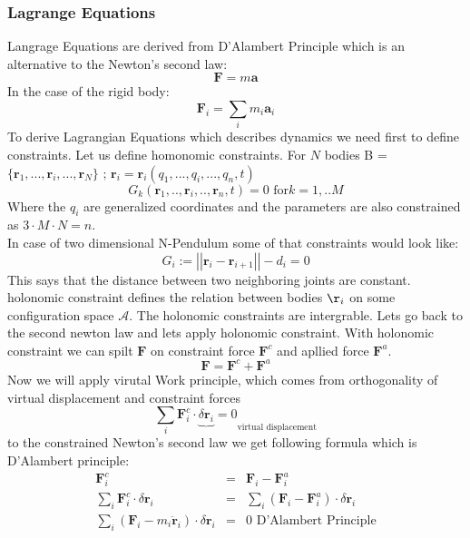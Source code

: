\subsubsection{Lagrange Equations}
Langrage Equations are derived from D’Alambert Principle\cite{dalambert} which is an alternative to the Newton's second law\cite{ClassPhy}:
\begin{equation}
	\mathbf{F} = m\mathbf{a}
\end{equation}   
In the case of the rigid body:
\begin{equation}
	\mathbf{F}_i = \sum_i{m_i \mathbf{a}_i}
\end{equation}
To derive Lagrangian Equations which describes dynamics we need first to define constraints. Let us define homonomic constraints.
For $N$ bodies B = $\{\mathbf{r}_1,...,\mathbf{r}_i,...,\mathbf{r}_N\}\text{ ; } \mathbf{r}_i=\mathbf{r}_i(q_1,...,q_i,...,q_n, t)$
\begin{equation}
	\boxed{G_k(\mathbf{r}_1,..,\mathbf{r}_i,..,\mathbf{r}_n,t)=0\text{ for}k=1,..M}
\end{equation}
Where the $q_i$ are generalized coordinates and the
parameters are also constrained as $3\cdot M\cdot N = n$.\\
In case of two dimensional N-Pendulum some of that constraints would look like:
\begin{equation}
	G_i := \left|\left|\mathbf{r}_i - \mathbf{r}_{i+1}\right|\right| - d_i = 0
\end{equation}
This says that the distance between two neighboring joints are constant.
holonomic constraint defines the relation between bodies $\r_i$ on some configuration space $\mathcal{A}$. The holonomic constraints are intergrable.
Lets go back to the second newton law and lets apply holonomic constraint. With holonomic constraint we can spilt $\mathbf{F}$ on constraint force $\mathbf{F}^c$ and apllied force $\mathbf{F}^a$.
\begin{equation}
	\mathbf{F} =\mathbf{F}^c + \mathbf{F}^a
\end{equation}
Now we will apply virutal Work principle, which comes from orthogonality of virtual displacement and constraint forces \cite{ortho}
\begin{equation}
	\boxed{\sum_i{\mathbf{F}_i^c \cdot \underbrace{\delta \mathbf{r}_i}=0}_\text{virtual displacement}}
\end{equation}
to the constrained Newton's second law we get following formula which is D'Alambert principle\cite{dalam}:
\begin{eqnarray}
	 \mathbf{F}^c_i &=& \mathbf{F}_i- \mathbf{F}^a_i\\
	 \sum_i{\mathbf{F}_i^c \cdot \delta \mathbf{r}_i} &=& \sum_i{(\mathbf{F}_i- \mathbf{F}^a_i) \cdot \delta \mathbf{r}_i}\\
	 \sum_i{(\mathbf{F}_i- m_i\ddot{\mathbf{r}}_i) \cdot \delta \mathbf{r}_i}&=&0\text{    D'Alambert Principle}
\end{eqnarray}\\
